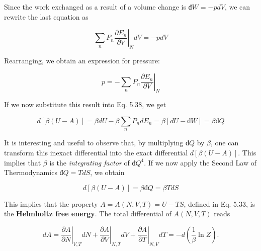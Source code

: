 \documentclass[12pt,a4paper]{report}
\newcommand{\esp}{\vspace{0.5cm}}
\begin{document}
\esp

Since the work exchanged as a result of a volume change is $đW = -pdV$, we can rewrite the last equation as

\esp

\begin{equation}
	\sum_{n} P_n \left. \frac{\partial E_n}{\partial V} \right|_N dV = -pdV \tag{5.44}
\end{equation}

\esp

Rearranging, we obtain an expression for pressure:

\esp

\begin{equation}
	p = -\sum_{n} P_n \left. \frac{\partial E_n}{\partial V} \right|_N \tag{5.45}
\end{equation}

\esp

If we now substitute this result into Eq. 5.38, we get

\esp

\begin{equation}
	d[\beta(U - A)] = \beta dU - \beta \sum_{n} P_n dE_n = \beta[dU - đW] = \beta đQ \tag{5.46}
\end{equation}

\esp

It is interesting and useful to observe that, by multiplying $đQ$ by $\beta$, one can transform this inexact differential into the exact differential $d[\beta(U - A)]$. This implies that $\beta$ is the \textit{integrating factor} of $đQ^4$. If we now apply the Second Law of Thermodynamics $đQ = TdS$, we obtain

\esp

\begin{equation}
	d[\beta(U - A)] = \beta đQ = \beta TdS \tag{5.47}
\end{equation}

\esp

This implies that the property $A = A(N,V,T) = U - TS$, defined in Eq. 5.33, is the \textbf{Helmholtz free energy}. The total differential of $A(N,V,T)$ reads

\esp

\begin{equation}
	dA = \left. \frac{\partial A}{\partial N} \right|_{V,T} dN + \left. \frac{\partial A}{\partial V} \right|_{N,T} dV + \left. \frac{\partial A}{\partial T} \right|_{N,V} dT = -d \left( \frac{1}{\beta} \ln Z \right) . \tag{5.48}
\end{equation}
\end{document}
